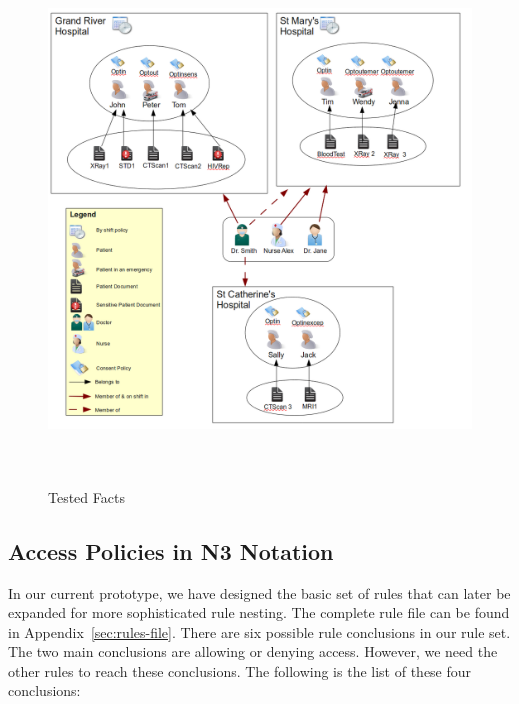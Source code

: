 \documentclass[conference]{IEEEtran}
\begin{document}
\begin{figure}[t]
\centering
\includegraphics[width=16cm,height=14cm]{BigPicture.png}
\caption{Tested Facts}
\label{fig:allfacts}
\end{figure}

\subsection{Access Policies in N3 Notation}
\label{rules-sec}

In our current prototype, we have designed the basic set of rules that can later be expanded for more sophisticated rule nesting. The complete rule file can be
found in Appendix~\ref{sec:rules-file}. There are six possible rule conclusions in our rule set. The two main conclusions are allowing or denying
access. However, we need the other rules to reach these conclusions. The following is the list of these four conclusions:
\end{document}
